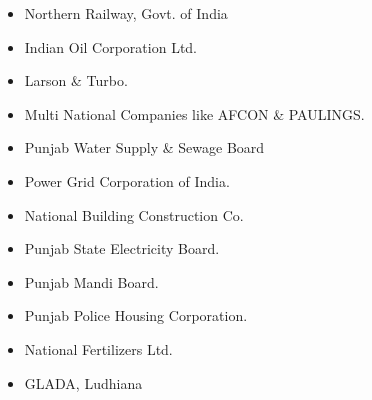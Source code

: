 \begin{itemize}
\item Northern Railway, Govt. of India
\item Indian Oil Corporation Ltd.
\item Larson \& Turbo.
\item Multi National Companies like AFCON \& PAULINGS.
\item Punjab Water Supply \& Sewage Board
\item Power Grid Corporation of India.
\item National Building Construction Co.
\item Punjab State Electricity Board.
\item Punjab Mandi Board.
\item Punjab Police Housing Corporation.
\item National Fertilizers Ltd.
\item GLADA, Ludhiana
\end{itemize}


